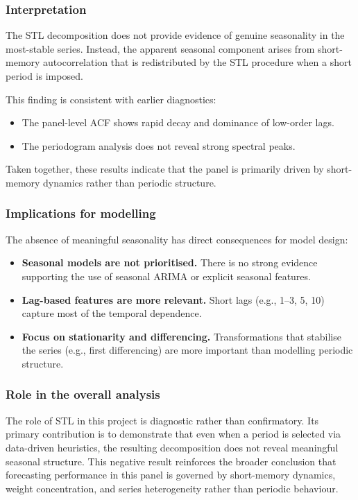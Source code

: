 \subsubsection{Interpretation}

The STL decomposition does not provide evidence of genuine seasonality in the most-stable series. Instead, the apparent seasonal component arises from short-memory autocorrelation that is redistributed by the STL procedure when a short period is imposed.

This finding is consistent with earlier diagnostics:
\begin{itemize}
    \item The panel-level ACF shows rapid decay and dominance of low-order lags.
    \item The periodogram analysis does not reveal strong spectral peaks.
\end{itemize}

Taken together, these results indicate that the panel is primarily driven by short-memory dynamics rather than periodic structure.

\subsubsection{Implications for modelling}

The absence of meaningful seasonality has direct consequences for model design:

\begin{itemize}
    \item \textbf{Seasonal models are not prioritised.} There is no strong evidence supporting the use of seasonal ARIMA or explicit seasonal features.
    
    \item \textbf{Lag-based features are more relevant.} Short lags (e.g., 1--3, 5, 10) capture most of the temporal dependence.
    
    \item \textbf{Focus on stationarity and differencing.} Transformations that stabilise the series (e.g., first differencing) are more important than modelling periodic structure.
\end{itemize}

\subsubsection{Role in the overall analysis}

The role of STL in this project is diagnostic rather than confirmatory. Its primary contribution is to demonstrate that even when a period is selected via data-driven heuristics, the resulting decomposition does not reveal meaningful seasonal structure. This negative result reinforces the broader conclusion that forecasting performance in this panel is governed by short-memory dynamics, weight concentration, and series heterogeneity rather than periodic behaviour.
